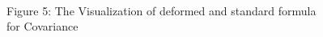 \documentclass[float=false,crop=false]{standalone}
\begin{document}
\begin{figure}
\centering%
    \begin{center}
    \end{center}
    { \hspace*{\fill} \\}
    \caption{Figure 5: The Visualization of deformed and standard formula\\for Covariance} \label{fig:C3_005}
\end{figure}


    
    
    
    
\end{document}
